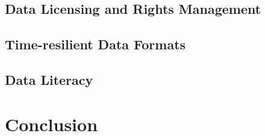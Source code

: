 \documentclass[runningheads,a4paper]{llncs}
\begin{document}
\subsection{Data Licensing and Rights Management}

\subsection{Time-resilient Data Formats}

\subsection{Data Literacy}

\section{Conclusion}












\end{document}
